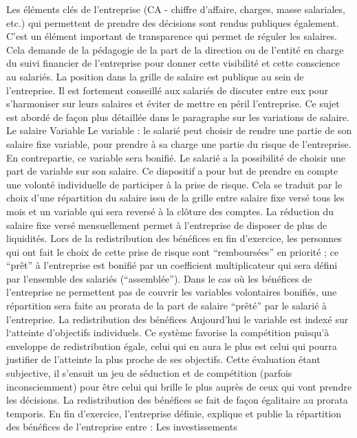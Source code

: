 \documentclass[12pt]{article}
\begin{document}
 Les éléments clés de l’entreprise (CA - chiffre d’affaire, charges, masse salariales, etc.) qui permettent de prendre des décisions sont rendus publiques également.
 C’est un élément important de transparence qui permet de réguler les salaires. Cela demande de la pédagogie de la part de la direction ou de l’entité en charge du suivi financier de l’entreprise pour donner cette visibilité et cette conscience au salariés.
 La position dans la grille de salaire est publique au sein de l’entreprise.
 Il est fortement conseillé aux salariés de discuter entre eux pour s’harmoniser sur leurs salaires et éviter de mettre en péril l’entreprise. Ce sujet est abordé de façon plus détaillée dans le paragraphe sur les variations de salaire.
 Le salaire Variable
 Le variable : le salarié peut choisir de rendre une partie de son salaire fixe variable, pour prendre à sa charge une partie du risque de l’entreprise. En contrepartie, ce variable sera bonifié. 
 Le salarié a la possibilité de choisir une part de variable sur son salaire. Ce dispositif a pour but de prendre en compte une volonté individuelle de participer à la prise de risque. Cela se traduit par le choix d’une répartition du salaire issu de la grille entre salaire fixe versé tous les mois et un variable qui sera reversé à la clôture des comptes. 
 La réduction du salaire fixe versé mensuellement permet à l’entreprise de disposer de plus de liquidités. Lors de la redistribution des bénéfices en fin d’exercice, les personnes qui ont fait le choix de cette prise de risque sont “remboursées” en priorité ; ce “prêt” à l’entreprise est bonifié par un coefficient multiplicateur qui sera défini par l’ensemble des salariés (“assemblée”). Dans le cas où les bénéfices de l’entreprise ne permettent pas de couvrir les variables volontaires bonifiés, une répartition sera faite au prorata de la part de salaire “prêté” par le salarié à l’entreprise.
 La redistribution des bénéfices
 Aujourd’hui le variable est indexé sur l‘atteinte d’objectifs individuels. Ce système favorise la compétition puisqu’à enveloppe de redistribution égale, celui qui en aura le plus est celui qui pourra justifier de l’atteinte la plus proche de ses objectifs. Cette évaluation étant subjective, il s'ensuit un jeu de séduction et de compétition (parfois inconsciemment) pour être celui qui brille le plus auprès de ceux qui vont prendre les décisions.
 La redistribution des bénéfices se fait de façon égalitaire au prorata temporis.
 En fin d’exercice, l’entreprise définie, explique et publie la répartition des bénéfices de l’entreprise entre :
 Les investissements
\end{document}
